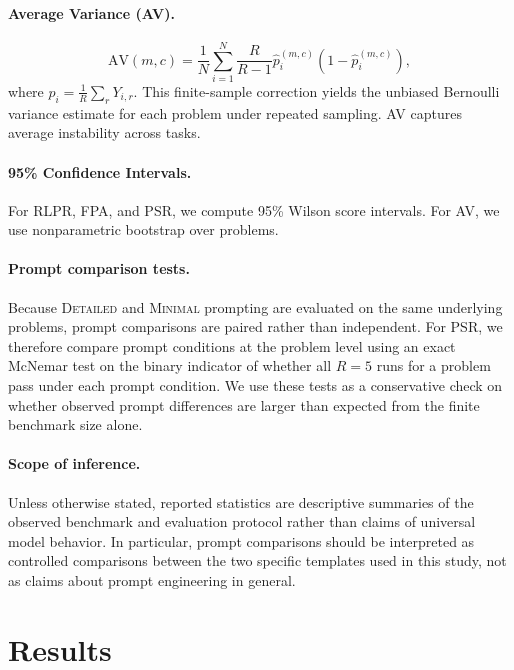 \documentclass[11pt]{article}
\begin{document}
\paragraph{Average Variance (AV).}
$$
\mathrm{AV}(m,c)=\frac{1}{N}\sum_{i=1}^{N} \frac{R}{R-1}\hat{p}_i^{(m,c)}\!\left(1-\hat{p}_i^{(m,c)}\right),
$$
where $\hat{p}_i = \frac{1}{R}\sum_r Y_{i,r}$. This finite-sample correction yields the unbiased Bernoulli variance estimate for each problem under repeated sampling. AV captures average instability across tasks.

\paragraph{95\% Confidence Intervals.}
For RLPR, FPA, and PSR, we compute 95\% Wilson score intervals. For AV, we use nonparametric bootstrap over problems.

\paragraph{Prompt comparison tests.}
Because \textsc{Detailed} and \textsc{Minimal} prompting are evaluated on the same underlying problems, prompt comparisons are paired rather than independent. For PSR, we therefore compare prompt conditions at the problem level using an exact McNemar test on the binary indicator of whether all $R=5$ runs for a problem pass under each prompt condition. We use these tests as a conservative check on whether observed prompt differences are larger than expected from the finite benchmark size alone.

\paragraph{Scope of inference.}
Unless otherwise stated, reported statistics are descriptive summaries of the observed benchmark and evaluation protocol rather than claims of universal model behavior. In particular, prompt comparisons should be interpreted as controlled comparisons between the two specific templates used in this study, not as claims about prompt engineering in general.

\section{Results}
\end{document}
